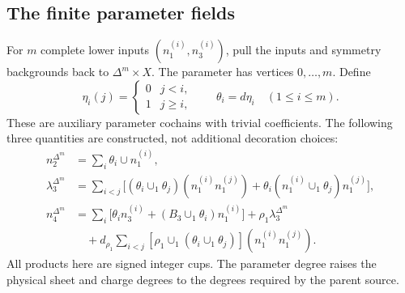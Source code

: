 \subsection{The finite parameter fields}\label{subsec:canonical3}
For $m$ complete lower inputs $(n_1^{(i)},n_3^{(i)})$, pull the inputs and symmetry backgrounds back to $\Delta^m\times X$. The parameter has vertices $0,\ldots,m$. Define
\begin{equation}\label{eq:parameter-heights}
 \eta_i(j)=\begin{cases}0&j<i,\\1&j\ge i,\end{cases}
 \qquad\theta_i=d\eta_i\quad(1\le i\le m).
\end{equation}
These are auxiliary parameter cochains with trivial coefficients. The following three quantities are constructed, not additional decoration choices:
\begin{align}\label{eq:parameter-fields}
 n_2^{\Delta^m}
 &=\sum_i\theta_i\cup n_1^{(i)},\nonumber\\
 \lambda_3^{\Delta^m}
 &=\sum_{i<j}\Big[(\theta_i\cup_1\theta_j)
                   (n_1^{(i)}n_1^{(j)})
   +\theta_i(n_1^{(i)}\cup_1\theta_j)n_1^{(j)}\Big],\nonumber\\
 n_4^{\Delta^m}
 &=\sum_i\Big[\theta_i n_3^{(i)}
               +(B_3\cup_1\theta_i)n_1^{(i)}\Big]
   +\rho_1\lambda_3^{\Delta^m}\nonumber\\
 &\quad+d_{\rho_1}\sum_{i<j}
       [\rho_1\cup_1(\theta_i\cup_1\theta_j)]
        (n_1^{(i)}n_1^{(j)}).
\end{align}
All products here are signed integer cups. The parameter degree raises the physical sheet and charge degrees to the degrees required by the parent source.

